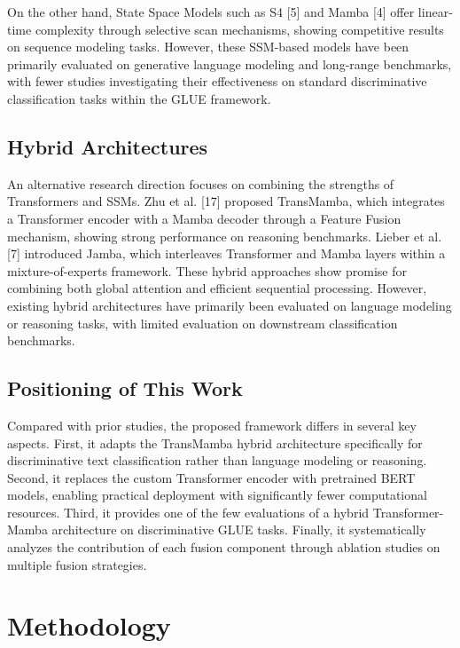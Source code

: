 \documentclass[10pt, conference]{IEEEtran}
\begin{document}
On the other hand, State Space Models such as S4 [5] and Mamba [4] offer linear-time complexity through selective scan mechanisms, showing competitive results on sequence modeling tasks. %
However, these SSM-based models have been primarily evaluated on generative language modeling and long-range benchmarks, with fewer studies investigating their effectiveness on standard discriminative classification tasks within the GLUE framework. %

\subsection{Hybrid Architectures} %
An alternative research direction focuses on combining the strengths of Transformers and SSMs. Zhu et al. [17] proposed TransMamba, which integrates a Transformer encoder with a Mamba decoder through a Feature Fusion mechanism, showing strong performance on reasoning benchmarks. %
Lieber et al. [7] introduced Jamba, which interleaves Transformer and Mamba layers within a mixture-of-experts framework. %
These hybrid approaches show promise for combining both global attention and efficient sequential processing. %
However, existing hybrid architectures have primarily been evaluated on language modeling or reasoning tasks, with limited evaluation on downstream classification benchmarks. %

\subsection{Positioning of This Work} %
Compared with prior studies, the proposed framework differs in several key aspects. %
First, it adapts the TransMamba hybrid architecture specifically for discriminative text classification rather than language modeling or reasoning. %
Second, it replaces the custom Transformer encoder with pretrained BERT models, enabling practical deployment with significantly fewer computational resources. %
Third, it provides one of the few evaluations of a hybrid Transformer-Mamba architecture on discriminative GLUE tasks. %
Finally, it systematically analyzes the contribution of each fusion component through ablation studies on multiple fusion strategies. %

\section{Methodology} %
\end{document}
